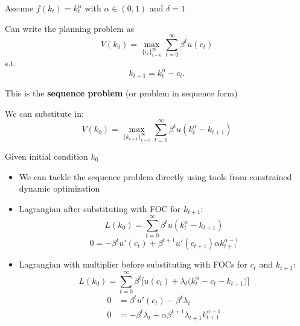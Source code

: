 \documentclass[11pt, aspectratio=169]{beamer}
\newenvironment{witemize}{\itemize\addtolength{\itemsep}{10pt}}{\enditemize}
\begin{document}
\begin{frame}{}
\begin{witemize}
\item Assume $f(k_t) = k_t^\alpha$ with $\alpha \in (0, 1)$ and $\delta = 1$

\item Can write the planning problem as 
\begin{equation*}
	V(k_0) = \max_{ \{ c_t \}_{t=0}^\infty } \sum_{t = 0}^\infty \beta^t u(c_t)
\end{equation*}
s.t. 
\begin{equation*}
	k_{t+1} = k_t^\alpha - c_t. 
\end{equation*}

\item This is the \textbf{sequence problem} (or problem in sequence form)

\item We can substitute in: 
\begin{equation*}
	V(k_0) = \max_{ \{ k_{t+1} \}_{t=0}^\infty } \sum_{t = 0}^\infty \beta^t u(k_t^\alpha  - k_{t+1})
\end{equation*}

\item Given initial condition $k_0$

\end{witemize}
\end{frame}



\begin{frame}{}
\begin{itemize}
\item We can tackle the sequence problem directly using tools from constrained dynamic optimization

\item Lagrangian after substituting with FOC for $k_{t+1}$:
\begin{equation*}
	L(k_0) =  \sum_{t = 0}^\infty \beta^t u(k_t^\alpha  - k_{t+1})
\end{equation*}
\begin{equation*}
	0 = - \beta^t u'(c_t) + \beta^{t+1} u'(c_{t+1}) \alpha k_{t+1}^{\alpha - 1}
\end{equation*}

\item Lagrangian with multiplier before substituting with FOCs for $c_t$ and $k_{t+1}$:
\begin{equation*}
	L(k_0) =  \sum_{t = 0}^\infty \beta^t \bigg[ u(c_t) + \lambda_t \bigg( k_t^\alpha - c_t - k_{t+1} \bigg) \bigg]
\end{equation*}
\begin{align*}
	0 &= \beta^t u'(c_t) - \beta^t \lambda_t \\
	0 &= -\beta^t \lambda_t + \alpha \beta^{t+1} \lambda_{t+1} k_{t+1}^{\alpha - 1}
\end{align*}

\end{itemize}
\end{frame}
\end{document}
